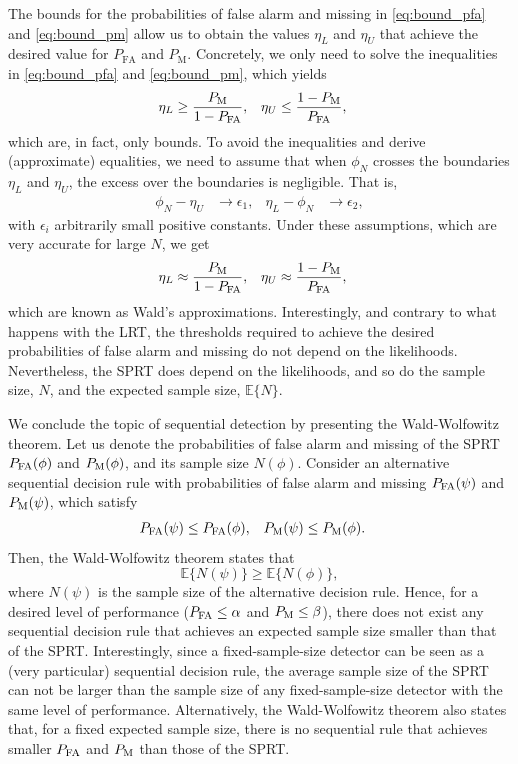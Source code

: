 The bounds for the probabilities of false alarm and missing in \eqref{eq:bound_pfa} and \eqref{eq:bound_pm} allow us to obtain the values $\eta_L$ and $\eta_U$ that achieve the desired value for $P_{\text{FA}}$ and $P_{\text{M}}$. Concretely, we only need to solve the inequalities in \eqref{eq:bound_pfa} and \eqref{eq:bound_pm}, which yields
\begin{align*}
	\eta_L &\geq \frac{P_{\text{M}}}{1 - P_{\text{FA}}},  &  \eta_U &\leq  \frac{1 - P_{\text{M}}}{P_{\text{FA}}},
\end{align*}
which are, in fact, only bounds. To avoid the inequalities and derive (approximate) equalities, we need to assume that when $\phi_N$ crosses the boundaries $\eta_L$ and $\eta_U$, the excess over the boundaries is negligible. That is,
\begin{align*}
	\phi_N - \eta_U &\rightarrow \epsilon_1,  &  \eta_L - \phi_N &\rightarrow \epsilon_2,
\end{align*}
with $\epsilon_i$ arbitrarily small positive constants. Under these assumptions, which are very accurate for large $N$, we get 
\begin{align*}
	\eta_L &\approx \frac{P_{\text{M}}}{1 - P_{\text{FA}}},  &  \eta_U &\approx  \frac{1 - P_{\text{M}}}{P_{\text{FA}}},
\end{align*}
which are known as Wald's approximations. Interestingly, and contrary to what happens with the LRT, the thresholds required to achieve the desired probabilities of false alarm and missing do not depend on the likelihoods. Nevertheless, the SPRT does depend on the likelihoods, and so do the sample size, $N$, and the expected sample size, $\mathbb{E}\{N\}$.

We conclude the topic of sequential detection by presenting the Wald-Wolfowitz theorem. Let us denote the probabilities of false alarm and missing of the SPRT $P_{\text{FA}}(\phi)$ and $P_{\text{M}}(\phi)$, and its sample size $N(\phi)$. Consider an alternative sequential decision rule with probabilities of false alarm and missing $P_{\text{FA}}(\psi)$ and $P_{\text{M}}(\psi)$, which satisfy
\begin{align*}
	P_{\text{FA}}(\psi) &\leq P_{\text{FA}}(\phi), & P_{\text{M}}(\psi) &\leq P_{\text{M}}(\phi).
\end{align*}
Then, the Wald-Wolfowitz theorem states that
\begin{equation*}
	\mathbb{E} \{N(\psi)\} \geq \mathbb{E} \{N(\phi)\},
\end{equation*}
where $N(\psi)$ is the sample size of the alternative decision rule. Hence, for a desired level of performance ($P_{\text{FA}} \leq \alpha$ and $P_{\text{M}} \leq \beta$), there does not exist any sequential decision rule that achieves an expected sample size smaller than that of the SPRT. Interestingly, since a fixed-sample-size detector can be seen as a (very particular) sequential decision rule, the average sample size of the SPRT can not be larger than the sample size of any fixed-sample-size detector  with the same level of performance. Alternatively, the Wald-Wolfowitz theorem also states that, for a fixed expected sample size, there is no sequential rule that achieves smaller $P_{\text{FA}}$ and $P_{\text{M}}$ than those of the SPRT.